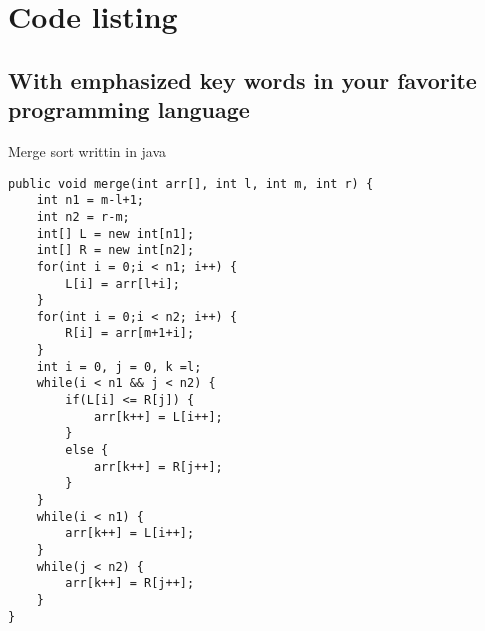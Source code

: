 \section{Code listing}
\subsection{With emphasized key words in your favorite programming language}
Merge sort writtin in java
\begin{lstlisting}
public void merge(int arr[], int l, int m, int r) {
    int n1 = m-l+1;
    int n2 = r-m;
    int[] L = new int[n1];
    int[] R = new int[n2];
    for(int i = 0;i < n1; i++) {
        L[i] = arr[l+i];
    }
    for(int i = 0;i < n2; i++) {
        R[i] = arr[m+1+i];
    }
    int i = 0, j = 0, k =l;
    while(i < n1 && j < n2) {
        if(L[i] <= R[j]) {
            arr[k++] = L[i++];
        }
        else {
            arr[k++] = R[j++];
        }
    }
    while(i < n1) {
        arr[k++] = L[i++];
    }
    while(j < n2) {
        arr[k++] = R[j++];
    }
}
\end{lstlisting}